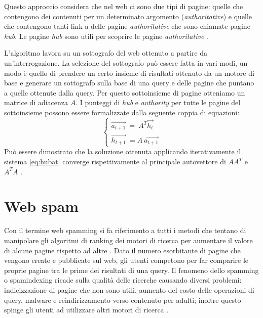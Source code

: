 Questo approccio considera che nel web ci sono due tipi di pagine: quelle che contengono dei contenuti per un determinato argomento (\textit{authoritative}) e quelle che contengono tanti link a delle pagine \textit{authoritative} che sono chiamate pagine \textit{hub}. Le pagine \textit{hub} sono utili per scoprire le pagine \textit{authoritative} \cite{Manning:2008:IIR:1394399p474}.

L'algoritmo lavora su un sottografo del web ottenuto a partire da un'interrogazione. La selezione del sottografo può essere fatta in vari modi, un modo è quello di prendere un certo insieme di risultati  ottenuto da un motore di base e generare un sottografo sulla base di una query e delle pagine che puntano a quelle ottenute dalla query. Per questo sottoinsieme di pagine otteniamo un matrice di adiacenza \(A\). I punteggi di \textit{hub} e \textit{authority} per tutte le pagine del sottoinsieme possono essere formalizzate dalla seguente coppia di equazioni:
\begin{equation}
 \left\{
 \begin{array}{cc}
    \stackrel{\rightarrow}{a_{t+1}} \: = \: A^T \stackrel{\rightarrow}{h_t}\\
    \stackrel{\rightarrow}{h_{t+1}} \:= A \: \stackrel{\rightarrow}{a_{t+1}}
 \end{array}
 \right .
 \label{eq:hubat}
\end{equation}
Può essere dimostrato che la soluzione ottenuta applicando iterativamente il sistema \ref{eq:hubat} converge rispettivamente al principale autovettore di \(AA^T\) e \(A^TA\) \cite{Manning:2008:IIR:1394399p474}\cite{Spirin:2012:SWS:2207243.2207252}.

\section{Web spam}
Con il termine web spamming si fa riferimento a tutti i metodi che tentano di manipolare gli algoritmi di ranking dei motori di ricerca per aumentare il valore di alcune pagine rispetto ad altre \cite{ilprints646}.
Dato il numero esorbitante di pagine che vengono create e pubblicate sul web, gli utenti competono per far comparire le proprie pagine tra le prime dei risultati di una query.
Il fenomeno dello spamming o spamindexing ricade sulla qualità delle ricerche causando diversi problemi: indicizzazione di pagine che non sono utili, aumento del costo delle operazioni di query, malware e reindirizzamento verso contenuto per adulti; inoltre questo spinge gli utenti ad utilizzare altri motori di ricerca \cite{Spirin:2012:SWS:2207243.2207252}.

